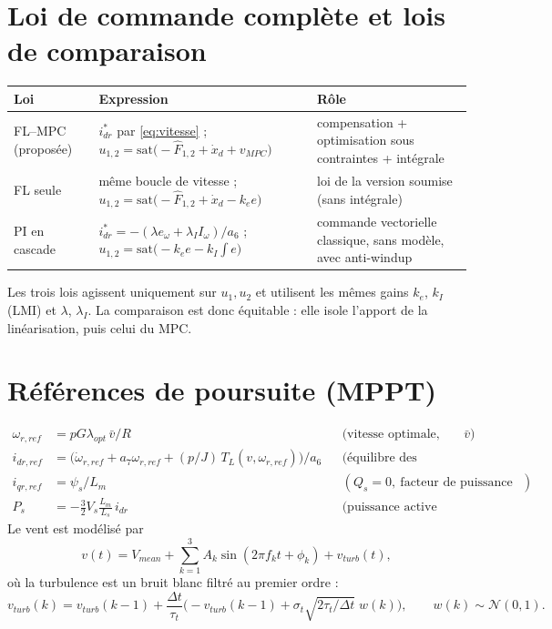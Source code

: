 \documentclass[11pt,a4paper]{article}
\begin{document}
\section{Loi de commande complète et lois de comparaison}
\begin{center}
\begin{tabular}{lp{6.2cm}p{5.2cm}}
\toprule
Loi & Expression & Rôle\\
\midrule
FL--MPC (proposée) & $i^\ast_{dr}$ par \eqref{eq:vitesse} ; $u_{1,2}=\mathrm{sat}\big(-\hat F_{1,2}+\dot x_d+v_{MPC}\big)$ & compensation + optimisation sous contraintes + intégrale\\
FL seule & même boucle de vitesse ; $u_{1,2}=\mathrm{sat}\big(-\hat F_{1,2}+\dot x_d-k_e e\big)$ & loi de la version soumise (sans intégrale)\\
PI en cascade & $i^\ast_{dr}=-(\lambda e_\omega+\lambda_I I_\omega)/a_6$ ; $u_{1,2}=\mathrm{sat}\big(-k_e e-k_I\!\int e\big)$ & commande vectorielle classique, sans modèle, avec anti-windup\\
\bottomrule
\end{tabular}
\end{center}
Les trois lois agissent uniquement sur $u_1,u_2$ et utilisent les mêmes gains $k_e$, $k_I$ (LMI) et $\lambda$, $\lambda_I$. La comparaison est donc équitable : elle isole l'apport de la linéarisation, puis celui du MPC.

\section{Références de poursuite (MPPT)}
\begin{align*}
\omega_{r,ref}&=pG\lambda_{opt}\,\bar v/R && \text{(vitesse optimale, vent filtré } \bar v)\\
i_{dr,ref}&=\big(\dot\omega_{r,ref}+a_7\omega_{r,ref}+(p/J)\,T_L(v,\omega_{r,ref})\big)/a_6 && \text{(équilibre des couples)}\\
i_{qr,ref}&=\psi_s/L_m && (Q_s=0,\ \text{facteur de puissance unitaire})\\
P_s&=-\tfrac32V_s\frac{L_m}{L_s}\,i_{dr} && \text{(puissance active statorique)}
\end{align*}
Le vent est modélisé par
\[
v(t)=V_{mean}+\sum_{k=1}^3A_k\sin(2\pi f_kt+\phi_k)+v_{turb}(t),
\]
où la turbulence est un bruit blanc filtré au premier ordre :
\[
v_{turb}(k)=v_{turb}(k-1)+\frac{\Delta t}{\tau_t}\Big(-v_{turb}(k-1)+\sigma_t\sqrt{2\tau_t/\Delta t}\;w(k)\Big),\qquad w(k)\sim\mathcal N(0,1).
\]
\end{document}

